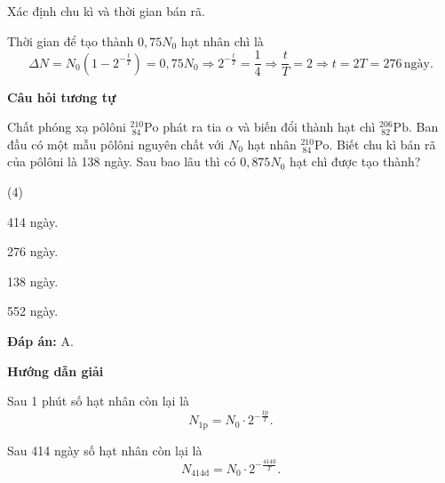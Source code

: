 \begin{dang}{Xác định chu kì và thời gian bán rã.}
{		Thời gian để tạo thành $0,75N_0$ hạt nhân chì là
		\begin{equation*}
			\Delta N= N_0\left( 1-2^{-\frac{t}{T}}\right)=0,75N_0\Rightarrow 2^{-\frac{t}{T}}=\dfrac{1}{4}\Rightarrow\dfrac{t}{T}=2\Rightarrow t=2T=276\,\text{ngày}.
		\end{equation*}
		
		\begin{center}
			\textbf{Câu hỏi tương tự}
		\end{center}
		
		Chất phóng xạ pôlôni $^{210}_{\ 84}\text{Po}$ phát ra tia $\alpha$ và biến đổi thành hạt chì $^{206}_{\ 82}\text{Pb}$. Ban đầu có một mẫu pôlôni nguyên chất với $N_0$ hạt nhân $^{210}_{\ 84}\text{Po}$. Biết chu kì bán rã của pôlôni là 138 ngày. Sau bao lâu thì có $0,875N_0$ hạt chì được tạo thành?
		\begin{mcq}(4)
			\item 414 ngày.
			\item 276 ngày.
			\item 138 ngày.
			\item 552 ngày.
		\end{mcq}
		
		\textbf{Đáp án:} A.}
	
	{
		\begin{center}
			\textbf{Hướng dẫn giải}
		\end{center}
		
		Sau 1 phút số hạt nhân còn lại là
		\begin{equation*}
			N_{1\text{p}}= N_0\cdot 2^{-\frac{1\text{p}}{T}}.
		\end{equation*}
		
		Sau 414 ngày số hạt nhân còn lại là
		\begin{equation*}
			N_{414\text{d}}= N_0\cdot 2^{-\frac{414\text{d}}{T}}.
		\end{equation*}
		
}
\end{dang}

